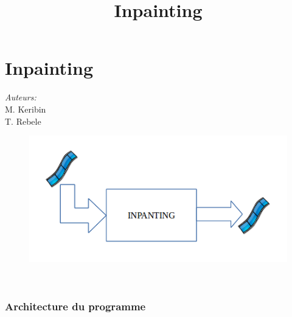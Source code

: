  \section{Inpainting}
 \begin{frame}
 \title{Inpainting}
 \titlepage

    \begin{minipage}{0.3\textwidth}
    \begin{flushleft} \large
    \emph{Auteurs:}\\
    M. Keribin\\
    T. Rebele
    \end{flushleft}
    \end{minipage}
    \begin{minipage}{0.5\textwidth}
    \begin{flushright} \large
    \begin{figure}
    \includegraphics[width=1.4\textwidth]{Fig/architectureSectionInpainting.png}
    \end{figure}
    \end{flushright}
    \end{minipage}\\[3cm]
    
 \end{frame}



\begin{frame}
  \frametitle{Architecture du programme}

\end{frame}



